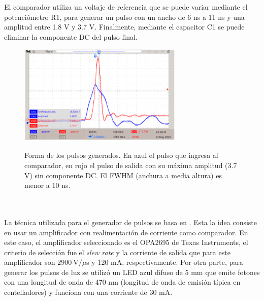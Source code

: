 El comparador utiliza un voltaje de referencia que se puede variar mediante el potenciómetro R1, para generar un pulso con un ancho de 6 ns a 11 ns y una amplitud entre 1.8 V y 3.7 V. Finalmente, mediante el capacitor C1 se puede eliminar la componente DC del pulso final.
\begin{figure}[h!]
\begin{centering}
    \caption{Forma de los pulsos generados. En azul el pulso que ingresa al comparador, en rojo el pulso de salida con su máxima amplitud (3.7 V) sin componente DC. El FWHM (anchura a media altura) es menor a 10 ns.}
   \includegraphics[width=0.7\textwidth]{Images/LED_Pulse_max.PNG}
    \label{fig:LED_Pulse_max}
  \par\end{centering}
\end{figure}
\\ \\
La técnica utilizada para el generador de pulsos se basa en \citep{Pulses_CFA}. Esta la idea consiste en usar un amplificador con realimentación de corriente como comparador. En este caso, el amplificador seleccionado es el OPA2695 de Texas Instruments, el criterio de selección fue el \textit{slew rate} y la corriente de salida que para este amplificador son $2900~\mbox{V}/\mu$s y 120 mA, respectivamente. Por otra parte, para generar los pulsos de luz se utilizó un LED azul difuso de 5 mm que emite fotones con una longitud de onda de 470 nm (longitud de onda de emisión típica en centelladores) y funciona con una corriente  de 30 mA. \\ \\
